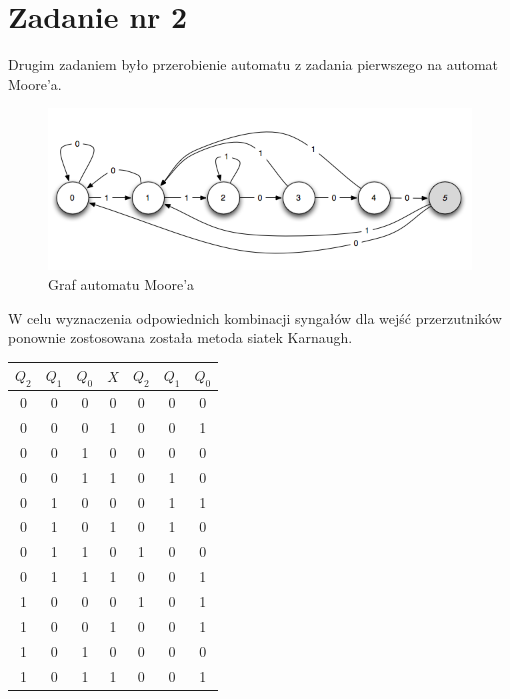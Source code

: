 \documentclass[wide,a4paper,titlepage,12pt] {article}
\begin{document}
  \section{Zadanie nr 2}
  Drugim zadaniem było przerobienie automatu z zadania pierwszego na automat Moore'a.

    \begin{figure}[htbp]
    \begin{center}
      \includegraphics[scale=0.7]{moore-graf.png}
      \caption{Graf automatu Moore'a}
     \end{center}
  \end{figure}

  W celu wyznaczenia odpowiednich kombinacji syngałów dla wejść przerzutników ponownie zostosowana została metoda siatek Karnaugh.

\begin{center}
\begin{tabular}{|c|c|c|c||c|c|c|}
  \hline
  $Q_{2}$ & $Q_{1}$ & $Q_{0}$ & $X$ & $Q_{2}$ & $Q_{1}$ & $Q_{0}$ \\
  \hline
  0 & 0 & 0 & 0 & 0 & 0 & 0 \\
  0 & 0 & 0 & 1 & 0 & 0 & 1 \\
  0 & 0 & 1 & 0 & 0 & 0 & 0 \\
  0 & 0 & 1 & 1 & 0 & 1 & 0 \\
  0 & 1 & 0 & 0 & 0 & 1 & 1 \\
  0 & 1 & 0 & 1 & 0 & 1 & 0 \\
  0 & 1 & 1 & 0 & 1 & 0 & 0 \\
  0 & 1 & 1 & 1 & 0 & 0 & 1 \\
  1 & 0 & 0 & 0 & 1 & 0 & 1 \\
  1 & 0 & 0 & 1 & 0 & 0 & 1 \\
  1 & 0 & 1 & 0 & 0 & 0 & 0 \\
  1 & 0 & 1 & 1 & 0 & 0 & 1 \\
  \hline
\end{tabular}
\end{center}
\end{document}
